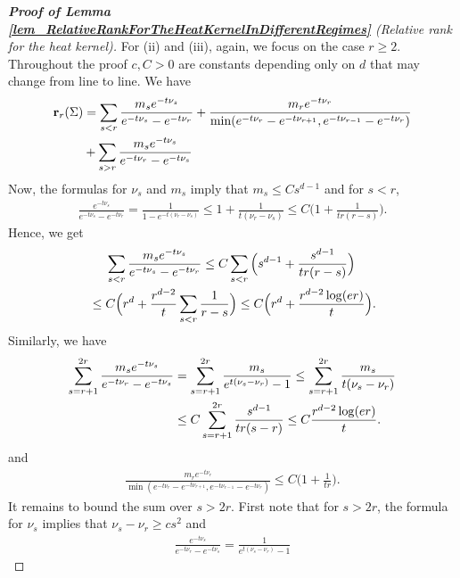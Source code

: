 \documentclass[a4paper,11pt]{article} %
\numberwithin{equation}{section}
\theoremstyle{definition}
\theoremstyle{remark}
\theoremstyle{plain}
\begin{document}
\begin{proof}[\normalfont \textbf{Proof of Lemma \ref{lem_RelativeRankForTheHeatKernelInDifferentRegimes}} (Relative rank for the heat kernel)]
  For (ii) and (iii), again, we focus on the case $ r \ge 2 $.
  Throughout the proof $ c, C > 0 $ are constants depending only on $d$ that may change from line to line.
  We have
  \begin{align}
        \mathbf{r}_r(\Sigma) 
    & = \sum_{s < r} \frac{m_s e^{-t \nu_s}}{e^{-t \nu_s} - e^{-t\nu_r}} 
      + \frac{m_r e^{-t \nu_r}}{\min(e^{-t \nu_r} - e^{-t \nu_{r + 1}}, e^{-t \nu_{r - 1}} - e^{-t \nu_r})}
    \\
    & + \sum_{s > r} \frac{m_s e^{-t \nu_s}}{e^{-t \nu_r} - e^{-t \nu_s}}
    \notag
  \end{align}
  Now, the formulas for $ \nu_s $ and $ m_s $ imply that \( m_{s} \le C s^{d - 1} \) and for $s < r$, 
  \begin{align}
    \frac{e^{-t \nu_s}}{e^{-t \nu_s} -e^{-t \nu_r}}
    =
    \frac{1}{1-e^{-t(\nu_r-\nu_s)}} 
    \le
    1 + \frac{1}{t(\nu_r-\nu_s)}
    \le
    C \Big( 1 + \frac{1}{t r (r - s)} \Big).
  \end{align}
  Hence, we get
  \begin{align}
    & \ \ \ \
    \sum_{s < r} \frac{m_s e^{-t \nu_s}}{e^{-t \nu_s} - e^{-t \nu_r}}
    \le
    C \sum_{s < r} \Big( s^{d-1} + \frac{s^{d-1}} {t r (r - s)} \Big)
    \\
    & \le
    C\Big(r^d+\frac{r^{d-2}}{t}\sum_{s<r}\frac{1}{r-s}\Big)
    \le 
    C \Big( r^d + \frac{r^{d - 2} \log(er)}{t} \Big).
    \notag
  \end{align}
  Similarly, we have
  \begin{align}
    \sum_{s = r + 1}^{2 r} \frac{m_s e^{-t \nu_s}}{e^{-t \nu_r} - e^{-t \nu_s}}
    &=
    \sum_{s = r + 1}^{2 r} \frac{m_s}{e^{t (\nu_s - \nu_r)} - 1}
    \le 
    \sum_{s = r + 1}^{2 r} \frac{m_s}{t (\nu_s - \nu_r)}
    \\
    & \le 
    C \sum_{s = r + 1}^{2 r} \frac{s^{d - 1}}{t r (s - r)}
    \le 
    C \frac{r^{d - 2} \log(e r)}{t}.
    \notag 
  \end{align}
  and
  \begin{align}\label{eq:iv:2:case}
    \frac{m_r e^{-t \nu_r}}{\min(e^{-t \nu_r} - e^{-t \nu_{r + 1}}, e^{-t \nu_{r - 1}} - e^{-t \nu_r})} 
    \le 
    C \Big( 1 + \frac{1}{t r} \Big).
  \end{align}
  It remains to bound the sum over $s > 2 r$.
  First note that for $s > 2 r$, the formula for $\nu_s$ implies that \( \nu_s - \nu_r \ge c s^2 \) and
  \begin{align}
    \frac{e^{-t \nu_s}}{e^{-t \nu_r} - e^{-t \nu_s}} 
    =
    \frac{1}{e^{t (\nu_s - \nu_r)} - 1} 

\end{align}
\end{proof}
\end{document}
